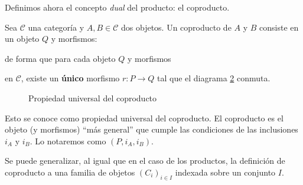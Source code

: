 Definimos ahora el concepto \textit{dual} del producto: el coproducto.

\begin{definicion}[Coproducto] \label{definicion_coproducto} 
    Sea \( \mathscr{C} \) una categoría y \( A, B \in \mathscr{C} \) dos objetos. Un coproducto de \( A \) y \( B \) consiste en un objeto \( Q \) y morfismos:

    \begin{center}
    \end{center}
    
    de forma que para cada objeto \( Q \) y morfismos

    \begin{figure}[htpb]
        \centering
        \label{diag:coproducto}
    \end{figure}

    en \( \mathscr{C} \), existe un \textbf{único} morfismo \( r: P \longrightarrow Q \) tal que el diagrama \ref{diag:universal-coproducto} conmuta.

    \begin{figure}[htpb]
        \centering
        \caption{Propiedad universal del coproducto}
        \label{diag:universal-coproducto}
    \end{figure} 

    Esto se conoce como propiedad universal del coproducto. El coproducto es el objeto (y morfismos) ``más general'' que cumple las condiciones de las inclusiones \( i_A \) y \( i_B \).
    Lo notaremos como \( (P, i_A, i_B) \).   
\end{definicion}

Se puede generalizar, al igual que en el caso de los productos, la definición de coproducto a una familia de objetos $\left(C_i\right)_{i \in I}$ indexada sobre un conjunto $I$.

